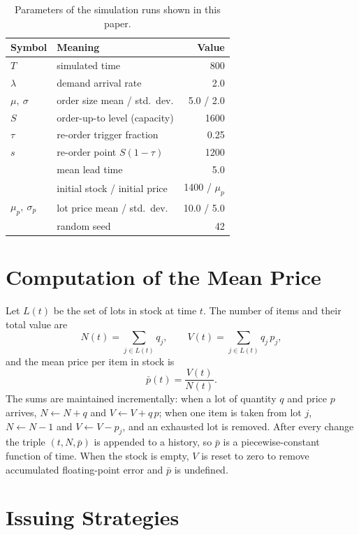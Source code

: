 \documentclass[11pt,a4paper]{article}
\begin{document}
\begin{table}[ht]
\centering
\begin{tabular}{llr}
\toprule
Symbol & Meaning & Value \\
\midrule
$T$ & simulated time & 800 \\
$\lambda$ & demand arrival rate & 2.0 \\
$\mu,\ \sigma$ & order size mean / std.\ dev. & 5.0 / 2.0 \\
$S$ & order-up-to level (capacity) & 1600 \\
$\tau$ & re-order trigger fraction & 0.25 \\
$s$ & re-order point $S(1-\tau)$ & 1200 \\
 & mean lead time & 5.0 \\
 & initial stock / initial price & 1400 / $\mu_p$ \\
$\mu_p,\ \sigma_p$ & lot price mean / std.\ dev. & 10.0 / 5.0 \\
 & random seed & 42 \\
\bottomrule
\end{tabular}
\caption{Parameters of the simulation runs shown in this paper.}
\label{tab:params}
\end{table}

\section{Computation of the Mean Price}

Let $L(t)$ be the set of lots in stock at time $t$. The number of items and
their total value are
\begin{equation}
  N(t)=\sum_{j\in L(t)} q_j,
  \qquad
  V(t)=\sum_{j\in L(t)} q_j\,p_j ,
\end{equation}
and the mean price per item in stock is
\begin{equation}
  \bar p(t)=\frac{V(t)}{N(t)} .
\end{equation}
The sums are maintained incrementally: when a lot of quantity $q$ and price $p$
arrives, $N\leftarrow N+q$ and $V\leftarrow V+q\,p$; when one item is taken
from lot $j$, $N\leftarrow N-1$ and $V\leftarrow V-p_j$, and an exhausted lot is
removed. After every change the triple $(t,N,\bar p)$ is appended to a history,
so $\bar p$ is a piecewise-constant function of time. When the stock is empty,
$V$ is reset to zero to remove accumulated floating-point error and $\bar p$ is
undefined.

\section{Issuing Strategies}
\label{sec:strategies}
\end{document}

